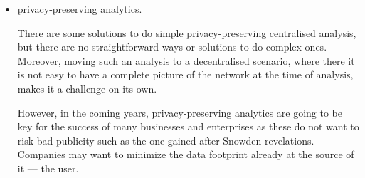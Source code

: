 \begin{itemize}[topsep=\parskip, parsep=\parskip, itemsep=\parskip]
    Although our focus in this work has been on decentralisation of centralised 
    \acp{is}, such as those where there can be various actors --- for example, in 
    \acp{osn}, there are also other scenarios where decentralisation could be of 
    interest
    
    For example, in home care --- where a nurse carries some sensitive \ac{pii} 
    in order to provide the right care to a patient and eventually returns to the 
    primary care facility with some new personal data about that patient, in 
    content-sharing or even in public ledging of transactions without a \ac{ttp} 
    --- such as those happening in the blockchain powering the crypto-currency \Bitcoin.
    
    \item privacy-preserving analytics.
    
    There are some solutions to do simple privacy-preserving centralised analysis, 
    but there are no straightforward ways or solutions to do complex ones. Moreover, 
    moving such an analysis to a decentralised scenario, where there it is not easy 
    to have a complete picture of the network at the time of analysis, makes it 
    a challenge on its own.
    
    However, in the coming years, privacy-preserving analytics are going to be key 
    for the success of many businesses and enterprises as these do not want to risk 
    bad publicity such as the one gained after Snowden revelations. Companies may 
    want to minimize the data footprint already at the source of it --- the user.
    

\end{itemize}

